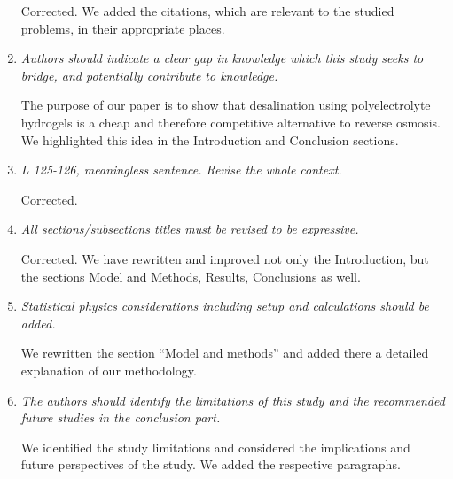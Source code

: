 \documentclass[12pt]{dinbrief}
\begin{document}
\begin{enumerate}
Corrected. We added the citations, which are relevant to the studied problems, in their appropriate places.
\item \textit{Authors should indicate a clear gap in knowledge which this study seeks to bridge, and potentially contribute to knowledge. }

The purpose of our paper is to show that desalination using polyelectrolyte hydrogels is a cheap and therefore competitive alternative to reverse osmosis.
We highlighted this idea in the Introduction and Conclusion sections.
\item \textit{L 125-126, meaningless sentence. Revise the whole context.}

Corrected.
\item \textit{All sections/subsections titles must be revised to be expressive.}

Corrected. We have rewritten and improved not only the Introduction, but the sections Model and Methods, Results, Conclusions as well.
\item \textit{Statistical physics considerations including setup and calculations should be added.}

We rewritten the section ``Model and methods'' and added there a detailed explanation of our methodology.
\item \textit{The authors should identify the limitations of this study and the recommended future studies in the conclusion part.}

We identified the study limitations and considered the implications and future perspectives of the study. We added the respective paragraphs.
\end{enumerate}








\end{document}
